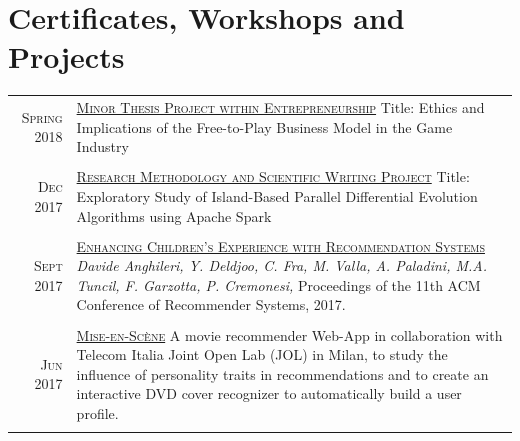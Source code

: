 \documentclass[a4paper,10pt]{article}
\begin{document}
\section{Certificates, Workshops and Projects}
\begin{tabular}{r|p{12cm}}

\textsc{Spring} 2018 &
\href{https://drive.google.com/file/d/1b_lHlvgywHEauQFdMg_j-ndgBh4n7KJT/view?usp=sharing}{\textsc{Minor Thesis Project within Entrepreneurship}} \newline \small{Title: Ethics and Implications of the Free-to-Play Business Model in the Game Industry} \\

\\

\textsc{Dec} 2017 &
\href{https://drive.google.com/file/d/1Ek7kZRvnRRklJAh8rlvWSrI8kMXpoxS4/view?usp=sharing}{\textsc{Research Methodology and Scientific Writing Project}} \newline \small{Title: Exploratory Study of Island-Based Parallel Differential Evolution Algorithms using Apache Spark} \\

\\

\textsc{Sept} 2017 &
\href{https://www.researchgate.net/publication/318542744_Enhancing_Children's_Experience_with_Recommendation_Systems}{\textsc{Enhancing Children’s Experience with Recommendation Systems}} \newline \small{\emph{Davide Anghileri, Y. Deldjoo, C. Fra, M. Valla, A. Paladini, M.A. Tuncil, F. Garzotta, P. Cremonesi,}} Proceedings of the 11th ACM Conference of Recommender Systems, 2017. \\

\\

\textsc{Jun} 2017 &
\href{https://www.youtube.com/watch?v=AbMl5wnMQrg&t=4s}{\textsc{Mise-en-Scène}} \newline \small{A movie recommender Web-App in collaboration with Telecom Italia Joint Open Lab (JOL) in Milan, to study the influence of personality traits in recommendations and to create an interactive DVD cover recognizer to automatically build a user profile.}  \\

\\


\end{tabular}
\end{document}
